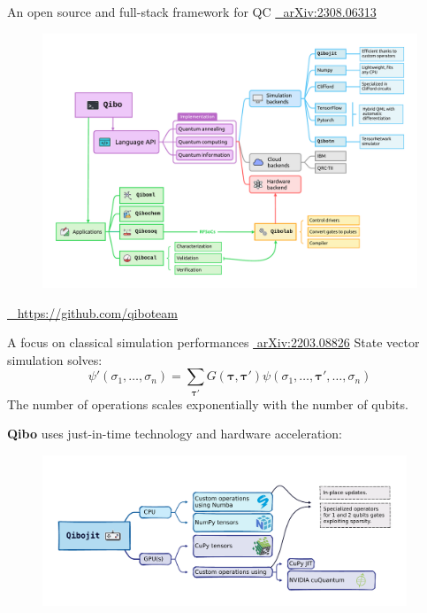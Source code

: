 \documentclass[aspectratio=169, 8pt, xcolor={svgnames}, hyperref={linkcolor=black}]{beamer}
\begin{document}
\begin{frame}{An open source and full-stack framework for QC \hfill \href{https://arxiv.org/abs/2308.06313}{\faBook\,\,	arXiv:2308.06313}}
\begin{figure}
   \includegraphics[width=0.8\linewidth]{figures/qibo_ecosystem.pdf}
\end{figure}  
\vspace{-0.8cm}
\hfill \href{https://github.com/qiboteam}{\faGithub ~ https://github.com/qiboteam}
\end{frame}

\begin{frame}{A focus on classical simulation performances \hfill \href{https://arxiv.org/abs/2203.08826}{\faBook\,\,arXiv:2203.08826}}
State vector simulation solves:
   \begin{equation*}
     \psi' (\sigma_1,\ldots,\sigma_n) = \sum_{\boldsymbol \tau'} G({\boldsymbol \tau},{\boldsymbol \tau}') \psi(\sigma_1,\ldots,{\boldsymbol \tau}',\ldots,\sigma_n)
   \end{equation*}
   The number of operations scales {\color{magenta} exponentially} with the number of qubits.

   \textbf{Qibo} uses just-in-time technology and hardware acceleration:
   \vspace{-0.35cm}
   \begin{figure}
     \includegraphics[height=4.5cm]{figures/qibojit.pdf}
   \end{figure}

\end{frame}
\end{document}
